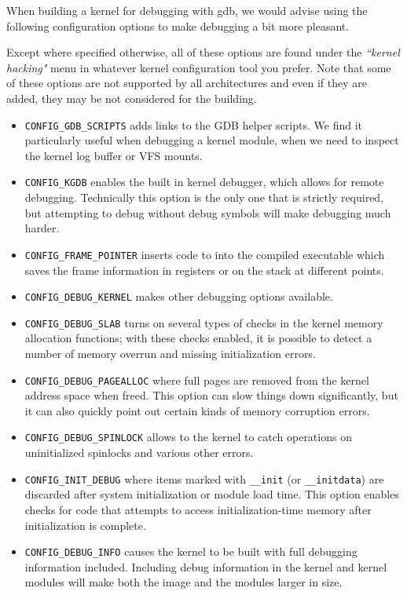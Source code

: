 \documentclass{masterthesis}
\begin{document}
When building a kernel for debugging with gdb, we would advise using the following configuration options to make debugging a bit more pleasant. 

Except where specified otherwise, all of these options are found under the \emph{``kernel hacking"} menu in whatever kernel configuration tool you prefer. Note that some of these options are not supported by all architectures and even if they are added, they may be not considered for the building.
\begin{itemize}
\item \texttt{CONFIG\_GDB\_SCRIPTS} adds links to the GDB helper scripts. We find it particularly useful when debugging a kernel module, when we need to inspect the kernel log buffer or VFS mounts.

\item \texttt{CONFIG\_KGDB} enables the built in kernel debugger, which allows for remote debugging. Technically this option is the only one that is strictly required, but attempting to debug without debug symbols will make debugging much harder.

\item \texttt{CONFIG\_FRAME\_POINTER} inserts code to into the compiled executable which saves the frame information in registers or on the stack at different points.

\item \texttt{CONFIG\_DEBUG\_KERNEL} makes other debugging options available.

\item \texttt{CONFIG\_DEBUG\_SLAB} turns on several types of checks in the kernel memory allocation functions; with these checks enabled, it is possible to detect a number of memory overrun and missing initialization errors.

\item \texttt{CONFIG\_DEBUG\_PAGEALLOC} where full pages are removed from the kernel address space when freed. This option can slow things down significantly, but it can also quickly point out certain kinds of memory corruption errors.

\item \texttt{CONFIG\_DEBUG\_SPINLOCK} allows to the kernel to catch operations on uninitialized spinlocks and various other errors.

\item \texttt{CONFIG\_INIT\_DEBUG} where items marked with \lstinline{__init} (or \lstinline{__initdata}) are discarded after system initialization or module load time. This option enables checks for code that attempts to access initialization-time memory after initialization is complete.

\item \texttt{CONFIG\_DEBUG\_INFO} causes the kernel to be built with full debugging information included. Including debug information in the kernel and kernel modules will make both the image and the modules larger in size.
\end{itemize}
\end{document}
